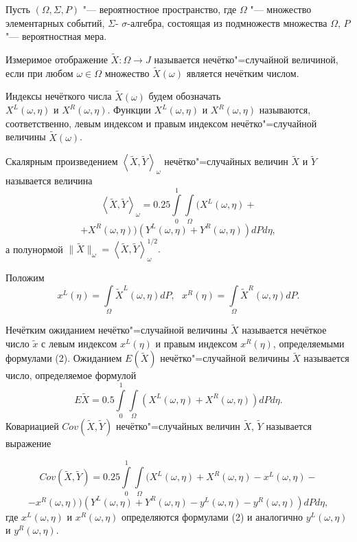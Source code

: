Пусть $(\Omega, \Sigma, P)$ "--- вероятностное пространство, где $\Omega$ "--- множество элементарных событий, $\Sigma $- $\sigma$-алгебра, состоящая из подмножеств множества $\Omega$, $P$ "--- вероятностная мера.

Измеримое отображение $\tilde{X}:\Omega\rightarrow J$ называется нечётко"=случайной величиной, если при любом $\omega\in\Omega$ множество $\tilde{X}(\omega)$ является нечётким числом.

Индексы нечёткого числа $\tilde{X}(\omega)$ будем обозначать
\\$X^L(\omega, \eta)$ и $X^R(\omega, \eta)$. Функции $X^L(\omega, \eta)$ и $X^R(\omega, \eta)$ называются, соответственно, левым индексом и правым индексом нечётко"=случайной величины $\tilde{X}(\omega)$.



Скалярным произведением $\left\langle \tilde{X}, \tilde{Y}\right\rangle_{\omega}$ нечётко"=случайных величин $\tilde{X}$ и $\tilde{Y}$ называется величина
$$
\left\langle \tilde{X}, \tilde{Y}\right\rangle_{\omega} = 0.25\int\limits_0^1\int\limits_{\Omega}(X^L(\omega, \eta) +
$$
$$
 + X^R(\omega, \eta))(Y^L(\omega, \eta) + Y^R(\omega, \eta))dPd\eta,
$$
а полунормой $\|\tilde{X}\|_{\omega} = \left\langle \tilde{X}, \tilde{Y}\right\rangle_{\omega}^{1/2}.$


Положим
\begin{equation}
x^L(\eta) = \int\limits_{\Omega}\tilde{X}^L(\omega, \eta)dP,\,\,\,\,x^R(\eta) = \int\limits_{\Omega}\tilde{X}^R(\omega, \eta)dP.
\end{equation}

Нечётким ожиданием нечётко"=случайной величины $\tilde{X}$
\linebreak
называется нечёткое число $\tilde{x}$ с левым индексом $x^L(\eta)$ и правым индексом $x^R(\eta)$, определяемыми формулами (2).
Ожиданием $E(\tilde{X})$ нечётко"=случайной величины $\tilde{X}$ называется число, определяемое формулой
$$
E\tilde{X} = 0.5\int\limits_0^1\int\limits_{\Omega}(X^L(\omega, \eta) + X^R(\omega, \eta))dPd\eta.
$$
Ковариацией $Cov(\tilde{X}, \tilde{Y})$ нечётко"=случайных величин $\tilde{X}$, $\tilde{Y}$ называется выражение

$$
Cov(\tilde{X}, \tilde{Y}) = 0.25\int\limits_0^1\int\limits_{\Omega}(X^L(\omega, \eta) + X^R(\omega, \eta) - x^L(\omega, \eta) - $$
$$
-x^R(\omega, \eta))(Y^L(\omega, \eta) + Y^R(\omega, \eta) - y^L(\omega, \eta) - y^R(\omega, \eta))dPd\eta
,
$$
где $x^L(\omega, \eta)$ и $x^R(\omega, \eta)$ определяются формулами (2) и аналогично $y^L(\omega, \eta)$ и $y^R(\omega, \eta)$.


